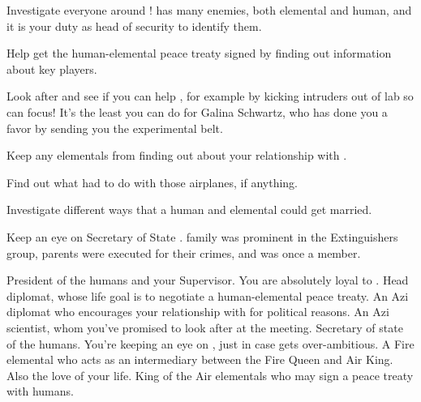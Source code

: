 \documentclass[char]{elementals}
\begin{document}
\begin{itemz}[Goals]
  \item Investigate everyone around \cLeader{\full}!  \cLeader{\They} has many enemies, both elemental and human, and it is your duty as head of security to identify them.
  \item Help \cLeader{} get the human-elemental peace treaty signed by finding out information about key players.
  \item Look after \cScientist{\full} and see if you can help \cScientist{\them}, for example by kicking intruders out of \cScientist{\their} lab so \cScientist{\they} can focus!  It's the least you can do for Galina Schwartz, who has done you a favor by sending you the experimental belt.
  \item Keep any elementals from finding out about your relationship with \cJuliet{}.
  \item Find out what \cJuliet{} had to do with those airplanes, if anything.
  \item Investigate different ways that a human and elemental could get married.
  \item Keep an eye on Secretary of State \cDema{\full}.  \cDema{\Their} family was prominent in the Extinguishers group, \cDema{\their} parents were executed for their crimes, and 
  \cDema{\they} \cDema{\themself} was once a member.
\end{itemz}

\begin{contacts}
  \contact{\cLeader{}} President of the humans and your Supervisor.  You are absolutely loyal to \cLeader{\them}.
  \contact{\cAvatar{}} Head diplomat, whose life goal is to negotiate a human-elemental peace treaty.
  \contact{\cDiplomat{}} An Azi diplomat who encourages your relationship with \cJuliet{} for political reasons.
  \contact{\cScientist{}} An Azi scientist, whom you've promised to look after at the meeting.
  \contact{\cDema{}} Secretary of state of the humans.  You're keeping an eye on \cDema{\them}, just in case \cDema{\they} gets over-ambitious.
  \contact{\cJuliet{}} A Fire elemental who acts as an intermediary between the Fire Queen and Air King.  Also the love of your life.
  \contact{\cKing{}} King of the Air elementals who may sign a peace treaty with humans.
\end{contacts}
\end{document}
